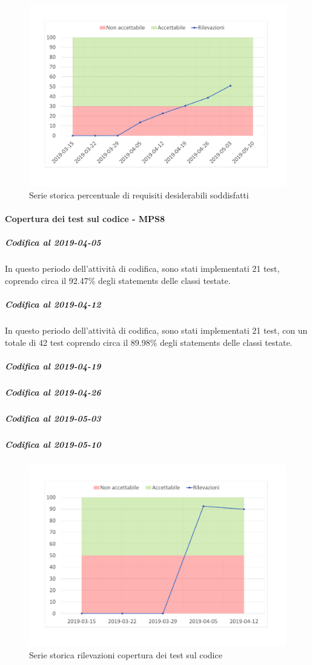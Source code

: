 \begin{figure}[H]
	\centering
	\includegraphics[scale=0.6]{images/resoconto/MPS7Chart.pdf}
	\caption{Serie storica percentuale di requisiti desiderabili soddisfatti}	
\end{figure}

\paragraph{Copertura dei test sul codice - MPS8}
\subparagraph{Codifica al 2019-04-05}
In questo periodo dell'attività di codifica, sono stati implementati 21 test, coprendo circa il 92.47\% degli statements delle classi testate.

\subparagraph{Codifica al 2019-04-12}
In questo periodo dell'attività di codifica, sono stati implementati 21 test, con un totale di 42 test coprendo circa il 89.98\% degli statements delle classi testate.

\subparagraph{Codifica al 2019-04-19}

\subparagraph{Codifica al 2019-04-26}

\subparagraph{Codifica al 2019-05-03}

\subparagraph{Codifica al 2019-05-10}

\begin{figure}[H]
	\centering
	\includegraphics[scale=0.6]{images/resoconto/MPS8Chart.pdf}
	\caption{Serie storica rilevazioni copertura dei test sul codice}	
\end{figure}


